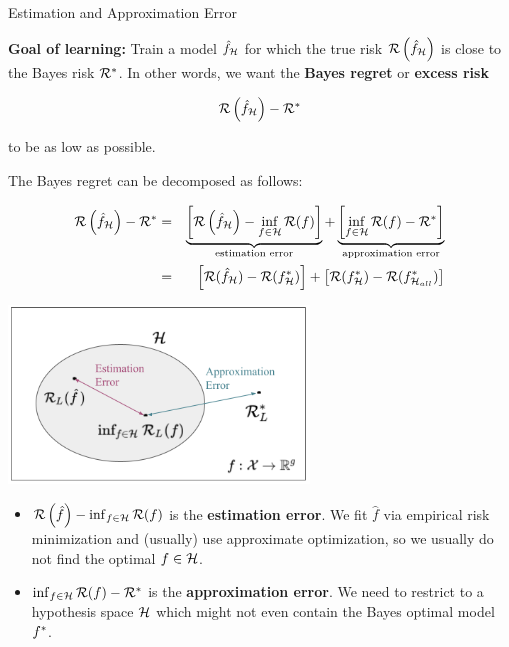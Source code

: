 \documentclass[11pt,compress,t,notes=noshow, xcolor=table]{beamer}
\begin{document}
\begin{vbframe}{Estimation and Approximation Error} 

\textbf{Goal of learning: } Train a model $\hat f_{\mathcal{H}}$ for which the true risk $\mathcal{R}\left(\hat f_{\mathcal{H}}\right)$ is close to the Bayes risk $\mathcal{R}^\ast$. In other words, we want the \textbf{Bayes regret} or \textbf{excess risk}


$$
	\mathcal{R}\left(\hat f_{\mathcal{H}}\right) - \mathcal{R}^\ast
$$ 

to be as low as possible. 

\lz 

The Bayes regret can be decomposed as follows: 

\begin{eqnarray*}
	\mathcal{R}\left(\hat f_{\mathcal{H}}\right) - \mathcal{R}^\ast &=& \underbrace{\left[\mathcal{R}\left(\hat f_{\mathcal{H}}\right) - \inf_{f \in \mathcal{H}} \mathcal{R}(f)\right]}_{\text{estimation error}} + \underbrace{\left[\inf_{f \in \mathcal{H}} \mathcal{R}(f) - \mathcal{R}^\ast\right]}_{\text{approximation error}} \\
    &=& \left[\mathcal{R}(\hat{f}_{\mathcal{H}}) - \mathcal{R}(f^{\ast}_{\mathcal{H}})\right] + \left[\mathcal{R}(f^{\ast}_{\mathcal{H}}) - \mathcal{R}(f^{\ast}_{\mathcal{H}_{all}}) \right] 
\end{eqnarray*}

\framebreak 


\begin{center}
\includegraphics[width=0.6\textwidth]{figure_man/risk_minimization_diagram.png}
\end{center}

\begin{itemize}
	\item $\mathcal{R}\left(\hat f\right) - \inf_{f \in \mathcal{H}} \mathcal{R}(f)$ is the \textbf{estimation error}. We fit $\hat f$ via empirical risk minimization and (usually) use approximate optimization, so we usually do not find the optimal $f \in \mathcal{H}$.
	\item $\inf_{f \in \mathcal{H}} \mathcal{R}(f) - \mathcal{R}^\ast$ is the \textbf{approximation error}. We need to restrict to a hypothesis space $\mathcal{H}$ which might not even contain the Bayes optimal model $f^{\ast}$. 
\end{itemize}

\end{vbframe}
\end{document}
